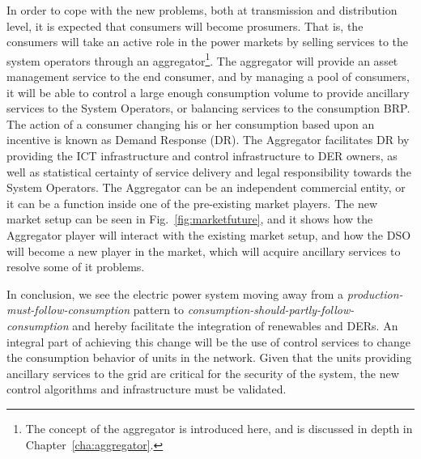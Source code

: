 In order to cope with the new problems, both at transmission and distribution level, it is expected that consumers will become prosumers. That is, the consumers will take an active role in the power markets by selling services to the system operators through an aggregator\footnote{The concept of the aggregator is introduced here, and is discussed in depth in Chapter~\ref{cha:aggregator}.}. The aggregator will provide an asset management service to the end consumer, and by managing a pool of consumers, it will be able to control a large enough consumption volume to provide ancillary services to the System Operators, or balancing services to the consumption BRP. The action of a consumer changing his or her consumption based upon an incentive is known as Demand Response (DR). The Aggregator facilitates DR by providing the ICT infrastructure and control infrastructure to DER owners, as well as statistical certainty of service delivery and legal responsibility towards the System Operators. The Aggregator can be an independent commercial entity, or it can be a function inside one of the pre-existing market players. The new market setup can be seen in Fig.~\ref{fig:marketfuture}, and it shows how the Aggregator player will interact with the existing market setup, and how the DSO will become a new player in the market, which will acquire ancillary services to resolve some of it problems.

In conclusion, we see the electric power system moving away from a \emph{production-must-follow-consumption} pattern to \emph{consumption-should-partly-follow-consumption} and hereby facilitate the integration of renewables and DERs. An integral part of achieving this change will be the use of control services to change the consumption behavior of units in the network. Given that the units providing ancillary services to the grid are critical for the security of the system, the new control algorithms and infrastructure must be validated.


